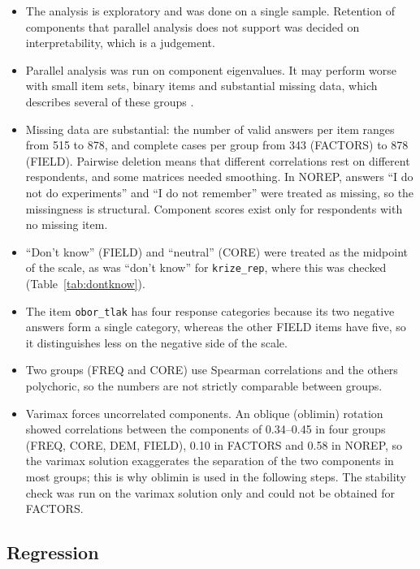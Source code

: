 \documentclass[11pt,a4paper]{article}
\newcommand{\var}[1]{\texttt{#1}}
\begin{document}
\begin{itemize}
\item The analysis is exploratory and was done on a single sample. Retention of components that parallel analysis does not support was decided on interpretability, which is a judgement.
\item Parallel analysis was run on component eigenvalues. It may perform worse with small item sets, binary items and substantial missing data, which describes several of these groups \citep{tran2009}.
\item Missing data are substantial: the number of valid answers per item ranges from 515 to 878, and complete cases per group from 343 (FACTORS) to 878 (FIELD). Pairwise deletion means that different correlations rest on different respondents, and some matrices needed smoothing. In NOREP, answers ``I do not do experiments'' and ``I do not remember'' were treated as missing, so the missingness is structural. Component scores exist only for respondents with no missing item.
\item ``Don't know'' (FIELD) and ``neutral'' (CORE) were treated as the midpoint of the scale, as was ``don't know'' for \var{krize\_rep}, where this was checked (Table~\ref{tab:dontknow}).
\item The item \var{obor\_tlak} has four response categories because its two negative answers form a single category, whereas the other FIELD items have five, so it distinguishes less on the negative side of the scale.
\item Two groups (FREQ and CORE) use Spearman correlations and the others polychoric, so the numbers are not strictly comparable between groups.
\item Varimax forces uncorrelated components. An oblique (oblimin) rotation showed correlations between the components of 0.34--0.45 in four groups (FREQ, CORE, DEM, FIELD), 0.10 in FACTORS and 0.58 in NOREP, so the varimax solution exaggerates the separation of the two components in most groups; this is why oblimin is used in the following steps. The stability check was run on the varimax solution only and could not be obtained for FACTORS.
\end{itemize}

\subsection{Regression}
\end{document}
